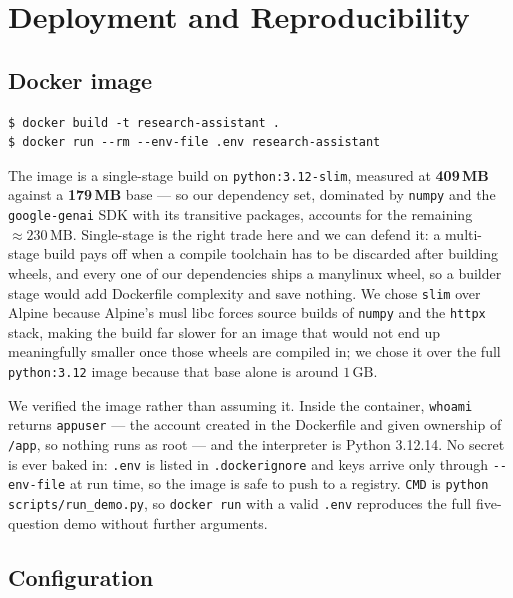 \documentclass[11pt,a4paper]{article}
\begin{document}
\section{Deployment and Reproducibility}\label{sec:deploy}

\subsection{Docker image}

\begin{lstlisting}[style=plain]
$ docker build -t research-assistant .
$ docker run --rm --env-file .env research-assistant
\end{lstlisting}

The image is a single-stage build on \texttt{python:3.12-slim}, measured at \textbf{409\,MB}
against a \textbf{179\,MB} base --- so our dependency set, dominated by \texttt{numpy} and the
\texttt{google-genai} SDK with its transitive packages, accounts for the remaining
$\approx 230\,\mathrm{MB}$. Single-stage is the right trade here and we can defend it: a
multi-stage build pays off when a compile toolchain has to be discarded after building wheels,
and every one of our dependencies ships a manylinux wheel, so a builder stage would add
Dockerfile complexity and save nothing. We chose \texttt{slim} over Alpine because Alpine's musl
libc forces source builds of \texttt{numpy} and the \texttt{httpx} stack, making the build far
slower for an image that would not end up meaningfully smaller once those wheels are compiled in;
we chose it over the full \texttt{python:3.12} image because that base alone is around
$1\,\mathrm{GB}$.

We verified the image rather than assuming it. Inside the container, \texttt{whoami} returns
\texttt{appuser} --- the account created in the Dockerfile and given ownership of \texttt{/app},
so nothing runs as root --- and the interpreter is Python 3.12.14. No secret is ever baked in: \texttt{.env} is listed in
\texttt{.dockerignore} and keys arrive only through \texttt{-{}-env-file} at run time, so the
image is safe to push to a registry. \texttt{CMD} is \texttt{python scripts/run\_demo.py}, so
\texttt{docker run} with a valid \texttt{.env} reproduces the full five-question demo without
further arguments.

\subsection{Configuration}
\end{document}
